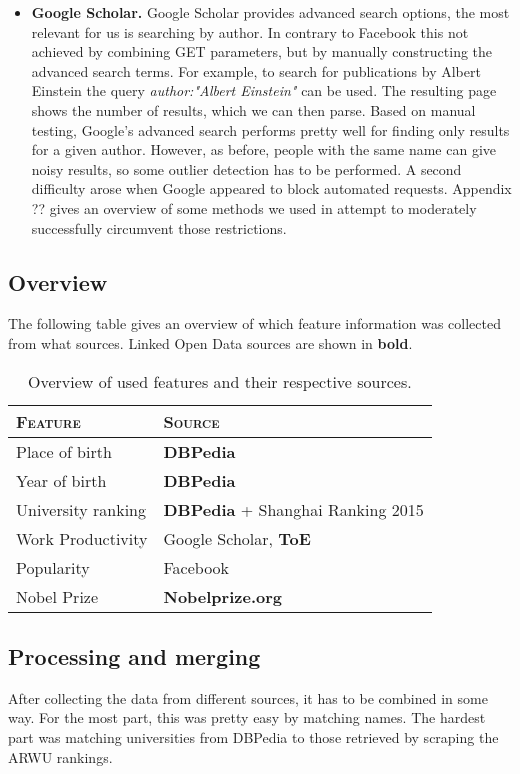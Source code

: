\begin{itemize}
\item{\textbf{Google Scholar. }} Google Scholar provides advanced search options, the most relevant for us is searching by author. In contrary to Facebook this not achieved by combining GET parameters, but by manually constructing the advanced search terms. For example, to search for publications by Albert Einstein the query  \emph{author:"Albert Einstein"} can be used. The resulting page shows the number of results, which we can then parse. Based on manual testing, Google's advanced search performs pretty well for finding only results for a given author. However, as before, people with the same name can give noisy results, so some outlier detection has to be performed. A second difficulty arose when Google appeared to block automated requests. Appendix ?? gives an overview of some methods we used in attempt to moderately successfully circumvent those restrictions.
\end{itemize}

\subsection{Overview}

The following table gives an overview of which feature information was collected from what sources. Linked Open Data sources are shown in \textbf{bold}.

\begin{table}[H]
\centering
\begin{tabular}{l|l}
	\textbf{\textsc{Feature}} & \textbf{\textsc{Source}} \\ \hline
	\rule{0pt}{4mm}Place of birth & \textbf{DBPedia} \\
	Year of birth & \textbf{DBPedia} \\
	University ranking & \textbf{DBPedia} + Shanghai Ranking 2015\\
	Work Productivity & Google Scholar, \textbf{ToE}\\
	Popularity & Facebook\\
	Nobel Prize& \textbf{Nobelprize.org}
\end{tabular}
\caption{Overview of used features and their respective sources.}
\end{table}

\subsection{Processing and merging}
\label{ssec:merging}
After collecting the data from different sources, it has to be combined in some way. For the most part, this was pretty easy by matching names. The hardest part was matching universities from DBPedia to those retrieved by scraping the ARWU rankings.
